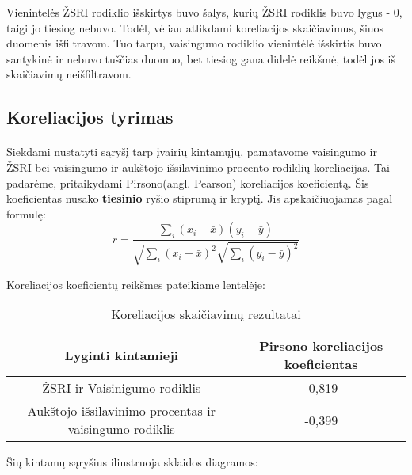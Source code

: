 Vienintelės ŽSRI rodiklio išskirtys buvo šalys, kurių ŽSRI rodiklis buvo lygus - 0, taigi jo tiesiog nebuvo. Todėl, vėliau atlikdami koreliacijos skaičiavimus, šiuos duomenis išfiltravom. Tuo tarpu, vaisingumo rodiklio vienintėlė išskirtis buvo santykinė ir nebuvo tuščias duomuo, bet tiesiog gana didelė reikšmė, todėl jos iš skaičiavimų neišfiltravom.

\pagebreak


\subsection{Koreliacijos tyrimas}
\paragraph{} Siekdami nustatyti sąryšį tarp įvairių kintamųjų, pamatavome vaisingumo ir ŽSRI bei vaisingumo ir aukštojo išsilavinimo procento rodiklių koreliacijas. Tai padarėme, pritaikydami Pirsono(angl. Pearson) koreliacijos koeficientą. Šis koeficientas nusako \textbf{tiesinio} ryšio stiprumą ir kryptį. Jis apskaičiuojamas pagal formulę: 
\begin{equation}
r = \frac{\sum\limits_i (x_i - \bar{x})(y_i - \bar{y})}{\sqrt{\sum\limits_i(x_i - \bar{x})^2}\sqrt{\sum\limits_i(y_i - \bar{y})^2}}
\end{equation}

Koreliacijos koeficientų reikšmes pateikiame lentelėje:
\begin{table}[H]
\begin{center}
    \caption{Koreliacijos skaičiavimų rezultatai}
    \begin{tabular}{|c|c|}
        \hline
        \textbf{Lyginti kintamieji} & \textbf{Pirsono koreliacijos koeficientas} \\\hline
        ŽSRI ir Vaisinigumo rodiklis & -0,819 \\\hline
        Aukštojo išsilavinimo procentas ir vaisingumo rodiklis & -0,399 \\\hline
    \end{tabular}
\end{center}
\end{table}

Šių kintamų sąryšius iliustruoja sklaidos diagramos:
\begin{multicols}{2}
\end{multicols}

